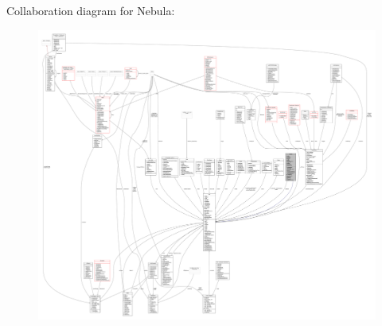 Collaboration diagram for Nebula\+:
\nopagebreak
\begin{figure}[H]
\begin{center}
\leavevmode
\includegraphics[width=350pt]{de/d3c/classNebula__coll__graph}
\end{center}
\end{figure}
